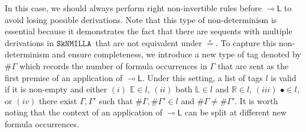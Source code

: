 \documentclass[submission,copyright,creativecommons]{eptcs}
\theoremstyle{definition}
\newtheorem{defn}{Definition}[section]
\newcommand{\lleft}{{\multimap}\mathsf{L}}
\newcommand{\tL}{\mathbb{L}}
\newcommand{\tR}{\mathbb{R}}
\newcommand{\tE}{\mathbb{E}}
\newcommand{\SkNMILLA}{$\mathtt{SkNMILLA}$}
\begin{document}
In this case, we should always perform right non-invertible rules before $\lleft$ to avoid losing possible derivations.
Note that this type of non-determinism is essential because it demonstrates the fact that there are sequents with multiple derivations in \SkNMILLA \ that are not equivalent under $\circeq$.
To capture this non-determinism and ensure completeness, we introduce a new type of tag denoted by $\# \Gamma$ which records the number of formula occurrences in $\Gamma$ that are sent as the first premise of an application of $\lleft$.
Under this setting, a list of tags $l$ is valid if it is non-empty and either $(i)$ $\tE \in l$, $(ii)$ both $\tL \in l$ and $\tR \in l$,  $(iii)$ $\bullet \in l$, or $(iv)$ there exist $\Gamma , \Gamma'$ such that $\# \Gamma , \# \Gamma' \in l$ and $\# \Gamma \neq \# \Gamma'$. 
It is worth noting that the context of an application of $\lleft$ can be split at different new formula occurrences.
\end{document}
